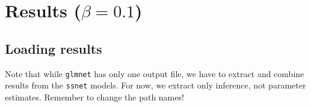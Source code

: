 \documentclass[
]{article}
\begin{document}
\hypertarget{results-beta-0.1}{%
\section{\texorpdfstring{Results
(\(\beta = 0.1\))}{Results (\textbackslash beta = 0.1)}}\label{results-beta-0.1}}

\hypertarget{loading-results}{%
\subsection{Loading results}\label{loading-results}}

Note that while \texttt{glmnet} has only one output file, we have to
extract and combine results from the \texttt{ssnet} models. For now, we
extract only inference, not parameter estimates. Remember to change the
path names!
\end{document}
